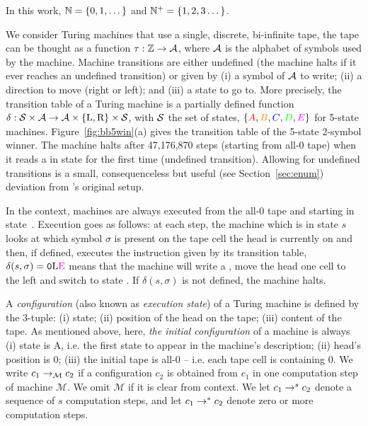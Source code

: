In this work, $\mathbb{N} = \{0,1,\dots\}$ and $\mathbb{N}^+ = \{1,2,3\dots\}$.

We consider Turing machines that use a single, discrete, bi-infinite tape, \ie the tape can be thought as a function $\tau: \mathbb{Z} \to \mathcal{A}$, where $\mathcal{A}$ is the alphabet of symbols used by the machine. Machine transitions are either undefined (the machine halts if it ever reaches an undefined transition) or given by (i) a symbol of $\mathcal{A}$ to write; (ii) a direction to move (right or left); and (iii) a state to go to. More precisely, the transition table of a Turing machine is a partially defined function $\delta: \mathcal{S} \times \mathcal{A} \to \mathcal{A} \times \{\text{L},\text{R}\} \times \mathcal{S} $, with $\mathcal{S}$ the set of states, \eg $\{\stateA,\stateB,\stateC,\stateD,\stateE\}$ for 5-state machines. Figure~\ref{fig:bb5win}(a) gives the transition table of the 5-state 2-symbol \BBfull winner. The machine halts after 47,176,870 steps (starting from all-0 tape) when it reads a \szero in state \stateE for the first time (undefined transition). Allowing for undefined transitions is a small, consequenceless but useful (see Section~\ref{sec:enum}) deviation from \rado's original setup.

In the \BBfull context, machines are always executed from the all-0 tape and starting in state~\stateA. Execution goes as follows: at each step, the machine which is in state $s$ looks at which symbol $\sigma$ is present on the tape cell the head is currently on and then, if defined, executes the instruction given by its transition table, \eg $\delta(s, \sigma) = \szero\text{L}\text{\stateE}$ means that the machine will write a \szero, move the head one cell to the left and switch to state \stateE. If $\delta(s, \sigma)$ is not defined, the machine halts.



A \textit{configuration} (also known as \textit{execution state}) of a Turing machine is defined by the 3-tuple: (i) state; (ii) position of the head on the tape; (iii) content of the tape. As mentioned above, here, \textit{the initial configuration} of a machine is always (i) state is A, i.e. the first state to appear in the machine's description; (ii) head's position is 0; (iii) the initial tape is all-0 -- i.e. each tape cell is containing 0. We write $c_1 \to_\mathcal{M} c_2$ if a configuration $c_2$ is obtained from $c_1$ in one computation step of machine $\mathcal{M}$. We omit $\mathcal{M}$ if it is clear from context. We let $c_1 \to^s c_2$ denote a sequence of $s$ computation steps, and let $c_1 \to^* c_2$ denote zero or more computation steps. %

